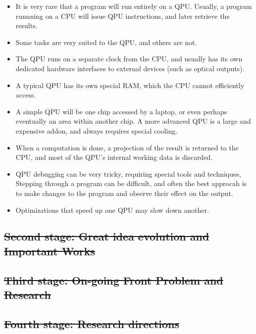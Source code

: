 \documentclass[]{article}
\begin{document}
\begin{itemize}
\item
  It is very rare that a program will run entirely on a QPU. Usually, a
  program runnning on a CPU will issue QPU instructions, and later
  retrieve the results.
\item
  Some tasks are very suited to the QPU, and others are not.
\item
  The QPU runs on a separate clock from the CPU, and usually has its own
  dedicated hardware interfaces to external devices (such as optical
  outputs).
\item
  A typical QPU has its own special RAM, which the CPU cannot
  efficiently access.
\item
  A simple QPU will be one chip accessed by a laptop, or even perhaps
  eventually an area within another chip. A more advanced QPU is a large
  and expensive addon, and always requires special cooling.
\item
  When a computation is done, a projection of the result is returned to
  the CPU, and most of the QPU's internal working data is discarded.
\item
  QPU debugging can be very tricky, requiring special tools and
  techniques, Stepping through a program can be difficult, and often the
  best approcah is to make changes to the program and observe their
  effect on the output.
\item
  Optimizations that speed up one QPU may slow down another.
\end{itemize}

\hypertarget{header-n1948}{%
\subsection{\texorpdfstring{\sout{Second stage: Great idea evolution and
Important
Works}}{Second stage: Great idea evolution and Important Works}}\label{header-n1948}}

\hypertarget{header-n1949}{%
\subsection{\texorpdfstring{\sout{Third stage: On-going Front Problem
and
Research}}{Third stage: On-going Front Problem and Research}}\label{header-n1949}}

\hypertarget{header-n1950}{%
\subsection{\texorpdfstring{\sout{Fourth stage: Research
directions}}{Fourth stage: Research directions}}\label{header-n1950}}
\end{document}
